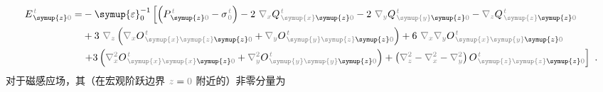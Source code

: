 \begin{subequations}
\begin{align}
	E^{\;\!\mathcolor{gray}{t}}_{\;\! \symup{z} \mathcolor{gray}{0}} = &- {\symup{\varepsilon}}_0^{-1} \left[ \left( P^{\;\!\mathcolor{gray}{t}}_{\;\! \symup{z} \mathcolor{gray}{0}} - {\sigma}^{\;\!\mathcolor{gray}{t}}_{\;\! \mathcolor{gray}{0}} \right) - 2~ \mathcolor{gray}{\nabla_x} Q^{\;\!\mathcolor{gray}{t}}_{\;\! \mathcolor{gray}{\symup{x}} \symup{z} \mathcolor{gray}{0}} - 2~ \mathcolor{gray}{\nabla_y} Q^{\;\!\mathcolor{gray}{t}}_{\;\! \mathcolor{gray}{\symup{y}} \symup{z} \mathcolor{gray}{0}} - \mathcolor{gray}{\nabla_z} Q^{\;\!\mathcolor{gray}{t}}_{\;\! \mathcolor{gray}{\symup{z}} \symup{z} \mathcolor{gray}{0}} \right. \label{eq:E_z0==} \\ & + 3~ \mathcolor{gray}{\nabla_z} \left( \mathcolor{gray}{\nabla_x} O^{\;\!\mathcolor{gray}{t}}_{\;\! \mathcolor{gray}{\symup{x}} \mathcolor{gray}{\symup{z}} \symup{z} \mathcolor{gray}{0}} + \mathcolor{gray}{\nabla_y} O^{\;\!\mathcolor{gray}{t}}_{\;\! \mathcolor{gray}{\symup{y}} \mathcolor{gray}{\symup{z}} \symup{z} \mathcolor{gray}{0}} \right) + 6~ \mathcolor{gray}{\nabla_x} \mathcolor{gray}{\nabla_y} O^{\;\!\mathcolor{gray}{t}}_{\;\! \mathcolor{gray}{\symup{x}} \mathcolor{gray}{\symup{y}} \symup{z} \mathcolor{gray}{0}} \\ & \left. + 3 \left( \mathcolor{gray}{\nabla_x^2} O^{\;\!\mathcolor{gray}{t}}_{\;\! \mathcolor{gray}{\symup{x}} \mathcolor{gray}{\symup{x}} \symup{z} \mathcolor{gray}{0}} + \mathcolor{gray}{\nabla_y^2} O^{\;\!\mathcolor{gray}{t}}_{\;\! \mathcolor{gray}{\symup{y}} \mathcolor{gray}{\symup{y}} \symup{z} \mathcolor{gray}{0}} \right) + \left( \mathcolor{gray}{\nabla_z^2} - \mathcolor{gray}{\nabla_x^2} - \mathcolor{gray}{\nabla_y^2} \right) O^{\;\!\mathcolor{gray}{t}}_{\;\! \mathcolor{gray}{\symup{z}} \mathcolor{gray}{\symup{z}} \symup{z} \mathcolor{gray}{0}} \right] ~.
\end{align}
\end{subequations}
对于磁感应场，其（在宏观阶跃边界 $\mathcolor{gray}{z \mathcolor{black}{=} 0}$ 附近的）非零分量为
